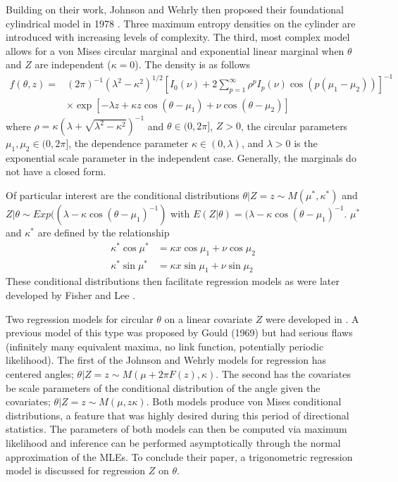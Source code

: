 Building on their work, Johnson and Wehrly then proposed their foundational cylindrical model in 1978 \cite{johnson_angular-linear_1978}. Three maximum entropy densities on the cylinder are introduced with increasing levels of complexity. The third, most complex model allows for a von Mises circular marginal and exponential linear marginal when $\theta$ and $Z$ are independent ($\kappa = 0$). The density is as follows \begin{equation*}
\begin{split}
f(\theta, z) = &(2\pi)^{-1}(\lambda^2 - \kappa^2)^{1/2} \left[I_0(\nu) + 2\sum_{p=1}^\infty \rho^p I_p(\nu) \cos(p(\mu_1 - \mu_2))\right]^{-1} \\
&\times \exp\left[-\lambda z + \kappa z \cos(\theta - \mu_1) + \nu \cos (\theta - \mu_2)\right]
\end{split}
\end{equation*} where $\rho = \kappa(\lambda + \sqrt{\lambda^2 - \kappa^2})^{-1}$ and $\theta \in (0, 2\pi]$, $Z > 0$, the circular parameters $\mu_1, \mu_2 \in (0,2\pi]$, the dependence parameter $\kappa \in (0,\lambda)$, and $\lambda > 0$ is the exponential scale parameter in the independent case. Generally, the marginals do not have a closed form. 

Of particular interest are the conditional distributions $\theta | Z = z \sim M(\mu^*, \kappa^*)$ and $Z | \theta \sim Exp((\lambda - \kappa \cos(\theta - \mu_1)^{-1})$ with $E(Z|\theta) = (\lambda - \kappa \cos(\theta - \mu_1)^{-1}$. $\mu^*$ and $\kappa^*$ are defined by the relationship \begin{align*}
    \kappa^* \cos \mu^* &= \kappa x \cos\mu_1 + \nu \cos \mu_2 \\
    \kappa^* \sin \mu^* &= \kappa x \sin\mu_1 + \nu \sin \mu_2 
\end{align*} These conditional distributions then facilitate regression models as were later developed by Fisher and Lee \cite{fisher_regression_1992}. 

Two regression models for circular $\theta$ on a linear covariate $Z$ were developed in \cite{johnson_angular-linear_1978}. A previous model of this type was proposed by Gould (1969) \cite{gould_regression_1969} but had serious flaws (infinitely many equivalent maxima, no link function, potentially periodic likelihood). The first of the Johnson and Wehrly models for regression has centered angles; $\theta | Z = z \sim M(\mu + 2\pi F(z), \kappa)$. The second has the covariates be scale parameters of the conditional distribution of the angle given the covariates; $\theta | Z = z \sim M(\mu, z\kappa)$. Both models produce von Mises conditional distributions, a feature that was highly desired during this period of directional statistics. The parameters of both models can then be computed via maximum likelihood and inference can be performed asymptotically through the normal approximation of the MLEs. To conclude their paper, a trigonometric regression model is discussed for regression $Z$ on $\theta$.

